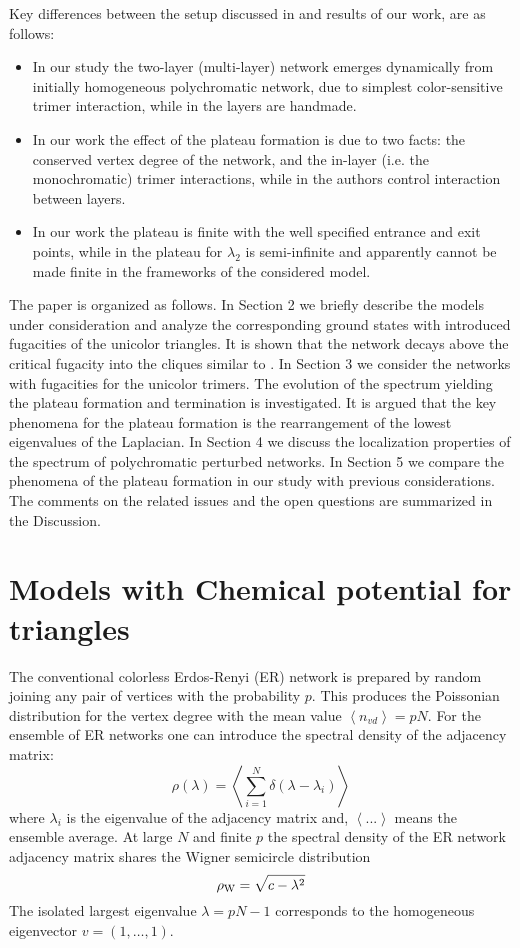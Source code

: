 \documentclass[aps,12pt]{revtex4}
\newcommand{\be}{\begin{equation}}
\newcommand{\ee}{\end{equation}}
\newcommand{\la}{\left<}
\newcommand{\ra}{\right>}
\begin{document}
Key differences between the setup discussed in \cite{arenas,vanmighem,radicchi} and results of our work, are as follows:
\begin{itemize}
\item In our study the two-layer (multi-layer) network emerges dynamically from initially homogeneous polychromatic network, due to simplest color-sensitive trimer interaction, while in \cite{arenas} the layers are handmade.
\item In our work the effect of the plateau formation is due to two facts: the conserved vertex degree of the network, and the in-layer (i.e. the monochromatic) trimer interactions, while in \cite{arenas} the authors control interaction between layers.
\item In our work the plateau is finite with the well specified entrance and exit points, while in \cite{arenas} the plateau for $\lambda_2$ is semi-infinite and apparently cannot be made finite in the frameworks of the considered model.
\end{itemize}

The paper is organized as follows. In Section 2 we briefly describe the models under consideration and analyze the corresponding ground states with introduced fugacities of the unicolor triangles. It is shown that the network decays above the critical fugacity into the cliques similar to \cite{decay}. In Section 3 we consider the networks with fugacities for the unicolor trimers. The evolution of the spectrum yielding the plateau formation and termination is investigated. It is argued that the key phenomena for the plateau formation is the rearrangement of the lowest eigenvalues of the Laplacian. In Section 4 we discuss the localization properties of the spectrum of polychromatic perturbed networks. In Section 5 we compare the phenomena of the plateau formation in our study with previous considerations. The comments on the  related issues and the open questions are summarized in the Discussion.

\section{Models with Chemical potential for triangles}


The conventional colorless Erdos-Renyi (ER) network is prepared by random joining any pair of vertices with the probability $p$. This produces the Poissonian distribution for the vertex degree with the mean value $\la n_{vd} \ra=pN$. For the ensemble of ER networks  one can introduce the spectral density of the adjacency matrix:
\be
\rho(\lambda)= \la \sum_{i=1}^N \delta(\lambda - \lambda_i)\ra
\ee
where $\lambda_i$ is the eigenvalue of the adjacency matrix and, $\la ...\ra$ means the ensemble average. At large $N$ and finite $p$ the spectral density of the ER network adjacency matrix shares the Wigner semicircle distribution
\be
\rho_{\rm W}= \sqrt{c - \lambda^2}
\ee
The isolated largest eigenvalue $\lambda = pN-1$ corresponds to the homogeneous eigenvector
$v=(1,\dots,1)$.
\end{document}
